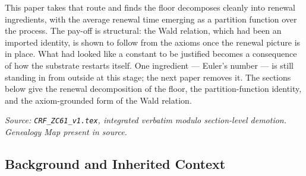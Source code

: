 \documentclass[12pt, a4paper]{article}
\begin{document}
This paper takes that route and finds the floor decomposes cleanly into renewal
ingredients, with the average renewal time emerging as a partition function over
the process. The pay-off is structural: the Wald relation, which had been an
imported identity, is shown to follow from the axioms once the renewal picture
is in place. What had looked like a constant to be justified becomes a
consequence of how the substrate restarts itself. One ingredient --- Euler's
number --- is still standing in from outside at this stage; the next paper
removes it. The sections below give the renewal decomposition of the floor, the
partition-function identity, and the axiom-grounded form of the Wald relation.
\label{sec:zc61}

\noindent
\textit{Source: \texttt{CRF\_ZC61\_v1.tex}, integrated verbatim modulo
section-level demotion. Genealogy Map present in source.}

\medskip
\subsection{Background and Inherited Context}
\label{sec:background}
\end{document}
